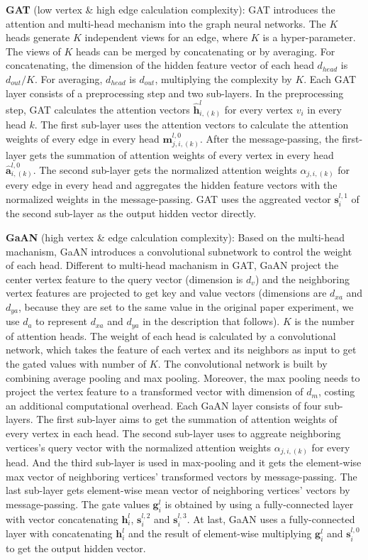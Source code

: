 \textbf{GAT} (low vertex \& high edge calculation complexity):
GAT introduces the attention and multi-head mechanism into the graph neural networks.
The $K$ heads generate $K$ independent views for an edge, where $K$ is a hyper-parameter.
The views of $K$ heads can be merged by concatenating or by averaging.
For concatenating, the dimension of the hidden feature vector of each head $d_{head}$ is $d_{out}/K$.
For averaging, $d_{head}$ is $d_{out}$, multiplying the complexity by $K$.
Each GAT layer consists of a preprocessing step and two sub-layers.
In the preprocessing step, GAT calculates the attention vectors $\hat{\boldsymbol{h}}^{l}_{i,(k)}$ for every vertex $v_i$ in every head $k$.
The first sub-layer uses the attention vectors to calculate the attention weights of every edge in every head $\boldsymbol{m}^{l,0}_{j,i,(k)}$.
After the message-passing, the first-layer gets the summation of attention weights of every vertex in every head $\hat{\boldsymbol{a}}^{l,0}_{i,(k)}$.
The second sub-layer gets the normalized attention weights $\alpha_{j, i, (k)}$ for every edge in every head and aggregates the hidden feature vectors with the normalized weights in the message-passing.
GAT uses the aggreated vector $\boldsymbol{s}^{l,1}_i$ of the second sub-layer as the output hidden vector directly.

\textbf{GaAN} (high vertex \& edge calculation complexity):
Based on the multi-head machanism, GaAN introduces a convolutional subnetwork to control the weight of each head. Different to multi-head machanism in GAT, GaAN project the center vertex feature to the query vector (dimension is $d_v$) and
the neighboring vertex features are projected to get key and value vectors (dimensions are $d_{xa}$ and $d_{ya}$, because they are set to the same value in the original paper experiment, we use $d_a$ to represent $d_{xa}$ and $d_{ya}$ in the description that follows).
$K$ is the number of attention heads. The weight of each head is calculated by a convolutional network, which takes the feature of each vertex and its neighbors as input to get the gated values with number of $K$. 
The convolutional network is built by combining average pooling and max pooling. Moreover, the max pooling needs to project the vertex feature to a transformed vector with dimension of $d_m$, costing an additional computational overhead.
Each GaAN layer consists of four sub-layers. The first sub-layer aims to get the summation of attention weights of every vertex in each head.
The second sub-layer uses to aggreate neighboring vertices's query vector with the normalized attention weights $\alpha_{j, i, (k)}$ for every head. 
And the third sub-layer is used in max-pooling and it gets the element-wise max vector of neighboring vertices' transformed vectors by message-passing.
The last sub-layer gets element-wise mean vector of neighboring vertices' vectors by message-passing. The gate values $\boldsymbol{g}^l_i$ is obtained by using a fully-connected layer with vector concatenating $\boldsymbol{h}^{l}_i$, $\boldsymbol{s}^{l, 2}_i$ and $\boldsymbol{s}^{l, 3}_i$.
At last, GaAN uses a fully-connected layer with concatenating $\boldsymbol{h}^{l}_i$ and the result of element-wise multiplying $\boldsymbol{g}^{l}_i$ and $\boldsymbol{s}^{l, 0}_i$ to get the output hidden vector.

